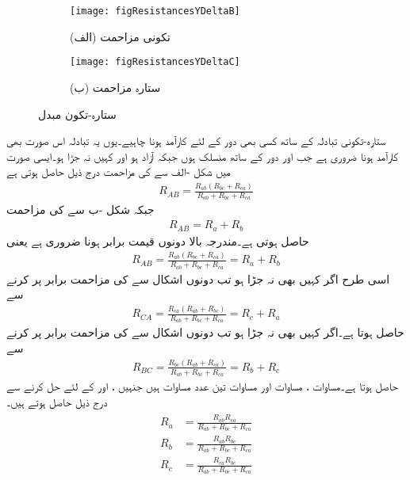 \begin{figure}
\centering
\begin{subfigure}{0.5\textwidth}
\centering
\texttt{[image: figResistancesYDeltaB]}
\caption*{(الف) تکونی مزاحمت}
\end{subfigure}%
\begin{subfigure}{0.5\textwidth}
\centering
\texttt{[image: figResistancesYDeltaC]}
\caption*{(ب) ستارہ مزاحمت}
\end{subfigure}%
\caption{ستارہ-تکون مبدل}
\label{شکل_مزاحمتی_ستارہ_تکون_مبدل}
\end{figure}
ستارہ-تکونی تبادلہ  کے ساتھ کسی بھی دور کے لئے کارآمد ہونا چاہیے۔یوں یہ تبادلہ اس صورت بھی کارآمد ہونا ضروری ہے جب  اور  دور کے ساتھ منسلک ہوں جبکہ  آزاد ہو اور کہیں نہ جڑا ہو۔ایسی صورت میں شکل  -الف سے  کی مزاحمت درج ذیل حاصل ہوتی ہے
\begin{align*}
R_{AB}=\frac{R_{ab}(R_{bc}+R_{ca})}{R_{ab}+R_{bc}+R_{ca}}
\end{align*}
جبکہ شکل -ب سے  کی مزاحمت
\begin{align*}
R_{AB}=R_a+R_b
\end{align*}
حاصل ہوتی ہے۔مندرجہ بالا دونوں قیمت برابر ہونا ضروری ہے یعنی
\begin{align}\label{مساوات_مزاحمتی_تکونی_ستارہ_الف}
R_{AB}=\frac{R_{ab}(R_{bc}+R_{ca})}{R_{ab}+R_{bc}+R_{ca}}=R_a+R_b
\end{align}
اسی طرح اگر  کہیں بھی نہ جڑا ہو تب دونوں اشکال سے  کی مزاحمت برابر پر کرنے سے
\begin{align}\label{مساوات_مزاحمتی_تکونی_ستارہ_ب}
R_{CA}=\frac{R_{ca}(R_{ab}+R_{bc})}{R_{ab}+R_{bc}+R_{ca}}=R_c+R_a
\end{align}
حاصل ہوتا ہے۔اگر   کہیں بھی نہ جڑا ہو تب دونوں اشکال سے  کی مزاحمت برابر پر کرنے سے
\begin{align}\label{مساوات_مزاحمتی_تکونی_ستارہ_پ}
R_{BC}=\frac{R_{bc}(R_{ab}+R_{ca})}{R_{ab}+R_{bc}+R_{ca}}=R_b+R_c
\end{align}
حاصل ہوتا ہے۔مساوات ، مساوات  اور مساوات  تین عدد مساوات ہیں جنہیں ،  اور  کے لئے حل کرنے سے درج ذیل حاصل ہوتے ہیں۔
\begin{gather}
\begin{aligned}\label{مساوات_مزاحمتی_تکون_سے_ستارہ}
R_a&=\frac{R_{ab} R_{ca}}{R_{ab}+R_{bc}+R_{ca}}\\
R_b&=\frac{R_{ab} R_{bc}}{R_{ab}+R_{bc}+R_{ca}}\\
R_c&=\frac{R_{ca} R_{bc}}{R_{ab}+R_{bc}+R_{ca}}
\end{aligned}
\end{gather}

